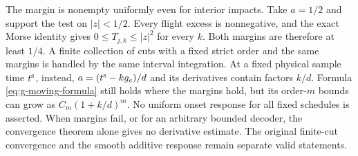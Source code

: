 The margin is nonempty uniformly even for interior impacts. Take $a=1/2$
and support the test on $|z|<1/2$. Every flight excess is nonnegative,
and the exact Morse identity gives $0\le T_{j,k}\le|z|^2$ for every
$k$. Both margins are therefore at least $1/4$. A finite collection of cuts with
a fixed strict order and the same margins is handled by the same interval
integration. At a fixed physical sample time $t^{\rm s}$, instead,
$a=(t^{\rm s}-kg_e)/d$ and its derivatives contain factors $k/d$.
Formula \eqref{eq:g-moving-formula} still holds where the margins hold,
but its order-$m$ bounds can grow as $C_m(1+k/d)^m$. No uniform onset
response for all fixed schedules is asserted. When margins fail, or
for an arbitrary bounded decoder, the convergence theorem alone gives
no derivative estimate. The original finite-cut convergence and the
smooth additive response remain separate valid statements.
